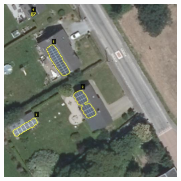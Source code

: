 \documentclass[12pt]{beamer}
\begin{document}
\begin{frame}
\begin{figure}
\begin{subfigure}{0.48\textwidth}
    		\includegraphics[width=\textwidth]{resources/jpg/609525_533266.jpg}
    	\end{subfigure}
    \end{figure}
\end{frame}
\end{document}
